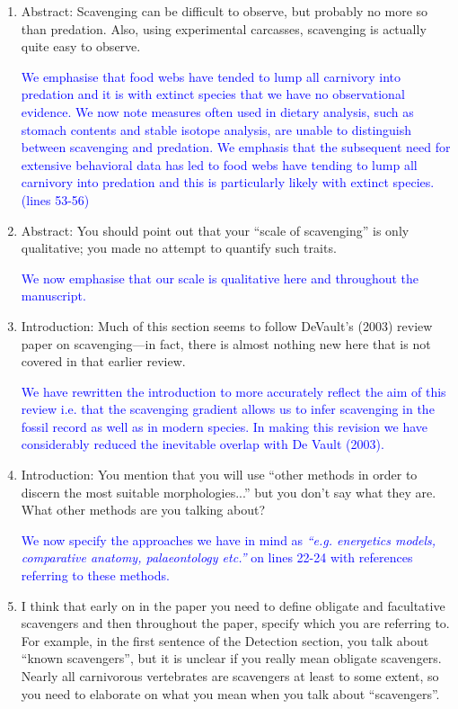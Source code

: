 \documentclass[12pt,letterpaper]{article}
\begin{document}
\begin{enumerate}
\item{Abstract: Scavenging can be difficult to observe, but probably no more so than predation.
Also, using experimental carcasses, scavenging is actually quite easy to observe.}

\textcolor{blue}{We emphasise that food webs have tended to lump all carnivory into predation and it is with extinct species that we have no observational evidence.
We now note measures often used in dietary analysis, such as stomach contents and stable isotope analysis, are unable to distinguish between scavenging and predation. We emphasis that the subsequent need for extensive behavioral data has led to food webs have tending to lump all carnivory into predation and this is particularly likely with extinct species. (lines 53-56)}


\item{Abstract: You should point out that your ``scale of scavenging'' is only qualitative; you made no attempt to quantify such traits.}

\textcolor{blue}{We now emphasise that our scale is qualitative here and throughout the manuscript.}%

\item{Introduction: Much of this section seems to follow DeVault's (2003) review paper on scavenging—in fact, there is almost nothing new here that is not covered in that earlier review.}

\textcolor{blue}{We have rewritten the introduction to more accurately reflect the aim of this review i.e. that the scavenging gradient allows us to infer scavenging in the fossil record as well as in modern species. In making this revision we have considerably reduced the inevitable overlap with De Vault (2003).} %

\item{Introduction: You mention that you will use ``other methods in order to discern the most suitable morphologies...''  but you don't say what they are. What other methods are you talking about?}

\textcolor{blue}{We now specify the approaches we have in mind as \textit{``e.g. energetics models, comparative anatomy, palaeontology etc.''} on lines 22-24 with references referring to these methods.}




\item{I think that early on in the paper you need to define obligate and facultative scavengers and then throughout the paper, specify which you are referring to. For example, in the first sentence of the Detection section, you talk about ``known scavengers'', but it is unclear if you really mean obligate scavengers. Nearly all carnivorous vertebrates are scavengers at least to some extent, so you need to elaborate on what you mean when you talk about ``scavengers''.}


\end{enumerate}
\end{document}
